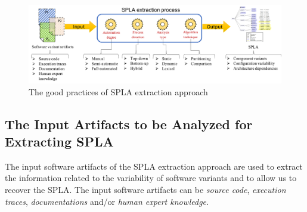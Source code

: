 \documentclass[graybox]{svmult}
\begin{document}
\begin{figure}[!htbp]
	\begin{center}
		\includegraphics[width=\textwidth]{figs/process-oriented-desing.png}
	\end{center}
	\caption{The good practices of SPLA extraction approach}
	\label{fig:SALife}
\end{figure}

\subsection{The Input Artifacts to be Analyzed for Extracting SPLA}
The input software artifacts of the SPLA extraction approach are used to extract the information related to the variability of software variants and to allow us to recover the SPLA. The input software artifacts can be \textit{source code}, \textit{execution traces}, \textit{documentations} and/or \textit{human expert knowledge}.
\end{document}
